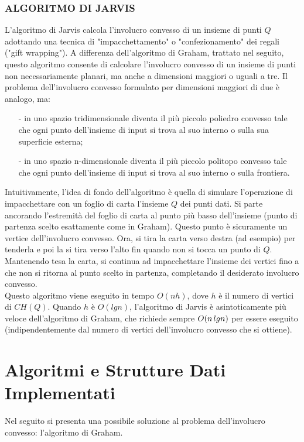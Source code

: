 \documentclass[12pt,a4paper]{report}
\begin{document}
\subsection*{\small{ALGORITMO DI JARVIS}}
L'algoritmo di Jarvis calcola l'involucro convesso di un insieme di punti $Q$ adottando una tecnica di "impacchettamento" o "confezionamento" dei regali ("gift wrapping"). A differenza dell'algoritmo di Graham, trattato nel seguito, questo algoritmo consente di calcolare l'involucro convesso di un insieme di punti non necessariamente planari, ma anche a dimensioni maggiori o uguali a tre. Il problema dell'involucro convesso formulato per dimensioni maggiori di due è analogo, ma:
\begin{itemize}
    \item[-] in uno spazio tridimensionale diventa il più piccolo poliedro convesso tale che ogni punto dell'insieme di input si trova al suo interno o sulla sua superficie esterna;
    \item[-] in uno spazio n-dimensionale diventa il più piccolo politopo convesso tale che ogni punto dell'insieme di input si trova al suo interno o sulla frontiera.
\end{itemize}
Intuitivamente, l'idea di fondo dell'algoritmo è quella di simulare l'operazione di impacchettare con un foglio di carta l'insieme $Q$ dei punti dati. Si parte ancorando l'estremità del foglio di carta al punto più basso dell'insieme (punto di partenza scelto esattamente come in Graham). Questo punto è sicuramente un vertice dell'involucro convesso. Ora, si tira la carta verso destra (ad esempio) per tenderla e poi la si tira verso l'alto fin quando non si tocca un punto di $Q$. Mantenendo tesa la carta, si continua ad impacchettare l'insieme dei vertici fino a che non si ritorna al punto scelto in partenza, completando il desiderato involucro convesso.\\

Questo algoritmo viene eseguito in tempo $O(nh)$, dove $h$ è il numero di vertici di $CH(Q)$. Quando $h$ è $O(lgn)$, l'algoritmo di Jarvis è asintoticamente più veloce dell'algoritmo di Graham, che richiede sempre $O(n\hspace{0.05cm}lgn)$ per essere eseguito (indipendentemente dal numero di vertici dell'involucro convesso che si ottiene).

\chapter{Algoritmi e Strutture Dati Implementati}\label{ch:implementazione}
Nel seguito si presenta una possibile soluzione al problema dell'involucro convesso: l'algoritmo di Graham.
\end{document}
